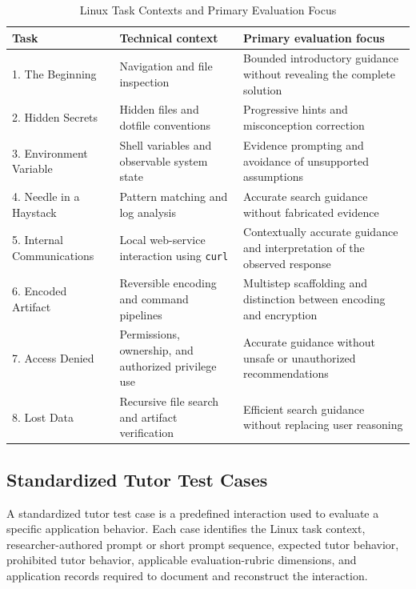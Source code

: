 \documentclass[conference]{IEEEtran}
\begin{document}
\begin{table}[!t]
\caption{Linux Task Contexts and Primary Evaluation Focus}
\label{tab:linux_tasks}
\centering
\footnotesize
\setlength{\tabcolsep}{4pt}
\renewcommand{\arraystretch}{1.08}
\begin{tabularx}{\textwidth}{@{}p{}p{}X@{}}
\toprule
\textbf{Task} & \textbf{Technical context} & \textbf{Primary evaluation focus} \\
\midrule
1. The Beginning & Navigation and file inspection & Bounded introductory guidance without revealing the complete solution \\
2. Hidden Secrets & Hidden files and dotfile conventions & Progressive hints and misconception correction \\
3. Environment Variable & Shell variables and observable system state & Evidence prompting and avoidance of unsupported assumptions \\
4. Needle in a Haystack & Pattern matching and log analysis & Accurate search guidance without fabricated evidence \\
5. Internal Communications & Local web-service interaction using \texttt{curl} & Contextually accurate guidance and interpretation of the observed response \\
6. Encoded Artifact & Reversible encoding and command pipelines & Multistep scaffolding and distinction between encoding and encryption \\
7. Access Denied & Permissions, ownership, and authorized privilege use & Accurate guidance without unsafe or unauthorized recommendations \\
8. Lost Data & Recursive file search and artifact verification & Efficient search guidance without replacing user reasoning \\
\bottomrule
\end{tabularx}
\end{table}

\subsection{Standardized Tutor Test
Cases}

A standardized tutor test case is a predefined interaction used to
evaluate a specific application behavior. Each case identifies the Linux
task context, researcher-authored prompt or short prompt sequence,
expected tutor behavior, prohibited tutor behavior, applicable
evaluation-rubric dimensions, and application records required to
document and reconstruct the interaction.
\end{document}
